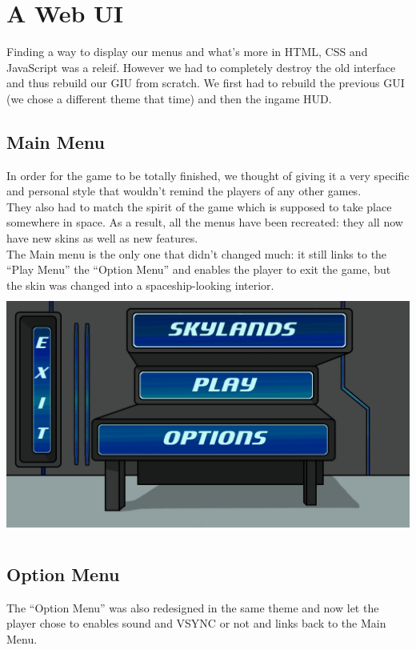 \documentclass[article]{report}         %
\begin{document}
      \section{A Web UI}
        Finding a way to display our menus and what's more in HTML, CSS and JavaScript was a releif. However we had to completely destroy the old interface and thus rebuild our GIU from scratch. We first had to rebuild the previous GUI (we chose a different theme that time) and then the ingame HUD.

           \subsection{ Main Menu}

    In order for the game to be totally finished, we thought of giving it a very specific and personal style that wouldn't remind the players of any other games. \\

    They also had to match the spirit of the game which is supposed to take place somewhere in space. As a result, all the menus have been recreated: they all now have new skins as well as new features.  \\ 
 
    The Main menu is the only one that didn't changed much: it still links to the ``Play Menu'' the ``Option Menu'' and enables the player to exit the game, but the skin was changed into a spaceship-looking interior. \\

    \includegraphics[width=15cm, height=8cm]{images/Menus/Menu_Normal_view.png} 
    \newpage
		\subsection{Option Menu}
    The ``Option Menu'' was also redesigned in the same theme and now let the player chose to enables sound and VSYNC or not and links back to the Main Menu. \\
\end{document}
